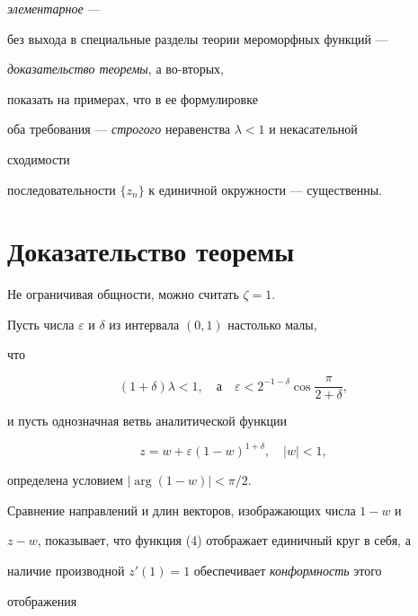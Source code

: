 {\it элементарное} --- 


без выхода в специальные разделы теории мероморфных функций --- 


{\it доказательство теоремы}, а во-вторых, 


показать на примерах, что в ее формулировке 


оба требования --- {\it строгого} неравенства $\lambda<1$ и некасательной 


сходимости 


последовательности $\{z_n\}$ к единичной окружности --- существенны. 


 


\section{Доказательство теоремы} 


 


Не ограничивая общности, можно считать $\zeta=1$. 


Пусть числа $\varepsilon$ и $\delta$ из интервала $(0,1)$ настолько малы, 


что 


\begin{equation} 


(1+\delta)\lambda<1,\quad 


\text{а}\quad 


\varepsilon<2^{-1-\delta}\cos\frac{\pi}{2+\delta}, 


\end{equation} 


и пусть однозначная ветвь аналитической функции 


\begin{equation} 


z=w+\varepsilon(1-w)^{1+\delta},\quad |w|<1, 


\end{equation} 


определена условием $|\arg(1-w)|<\pi/2$. 


 


Сравнение направлений и длин векторов, изображающих числа $1-w$ и 


$z-w$, показывает, что функция (4) отображает единичный круг в себя, а 


наличие производной $z'(1)=1$ обеспечивает {\it конформность} этого 


отображения 


